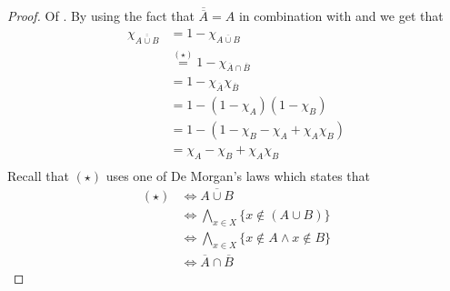 \begin{proof}
    Of .
    By using the fact that $\overline{\overline{A}}=A$ in combination with 
     and
     we get that
    \begin{align*}
        \chi_{\overline{\overline{A \cup B}}} 
        &= 1 - \chi_{\overline{A \cup B}}\\
        &\overset{(\star)}{=} 1 - \chi_{\overline{A} \cap \overline{B}}\\
        &= 1 - \chi_{\overline{A}} \chi_{\overline{B}}\\
        &= 1 - (1 - \chi_A)(1 - \chi_B)\\
        &= 1 - \left(1 - \chi_B - \chi_A + \chi_A\chi_B\right)\\
        &= \chi_A - \chi_B + \chi_A\chi_B\\
    \end{align*}
    Recall that $(\star)$ uses one of De Morgan's laws which states that
    \begin{align*}
        (\star) &\iff \overline{A \cup B}\\
                &\iff \bigwedge_{x\in X}\{x\notin (A\cup B)\}\\
                &\iff \bigwedge_{x\in X}\{x\notin A \land x\notin B\}\\
                &\iff \overline{A} \cap \overline{B}
    \end{align*}
\end{proof}